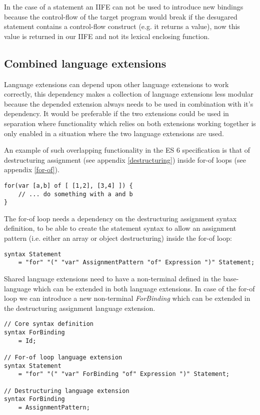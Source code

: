 In the case of a statement an IIFE can not be used to introduce new bindings because the control-flow of the target program would break if the desugared statement contains a control-flow construct (e.g. it returns a value), now this value is returned in our IIFE and not its lexical enclosing function.

\subsection{Combined language extensions} \label{par:combined-extensions}
Language extensions can depend upon other language extensions to work correctly, this dependency makes a collection of language extensions less modular because the depended extension always needs to be used in combination with it's dependency. It would be preferable if the two extensions could be used in separation where functionality which relies on both extensions working together is only enabled in a situation where the two language extensions are used.

An example of such overlapping functionality in the ES 6 specification is that of destructuring assignment (see appendix \ref{destructuring}) inside for-of loops (see appendix \ref{for-of}).

\begin{lstlisting}
for(var [a,b] of [ [1,2], [3,4] ]) {
	// ... do something with a and b
}
\end{lstlisting}

The for-of loop needs a dependency on the destructuring assignment syntax definition, to be able to create the statement syntax to allow an assignment pattern (i.e. either an array or object destructuring) inside the for-of loop:

\begin{lstlisting}[language=rascal]
syntax Statement
	= "for" "(" "var" AssignmentPattern "of" Expression ")" Statement;
\end{lstlisting}

Shared language extensions need to have a non-terminal defined in the base-language which can be extended in both language extensions. In case of the for-of loop we can introduce a new non-terminal \textit{ForBinding} which can be extended in the destructuring assignment language extension.

\begin{lstlisting}[language=rascal]
// Core syntax definition
syntax ForBinding
	= Id;

// For-of loop language extension
syntax Statement
	= "for" "(" "var" ForBinding "of" Expression ")" Statement;

// Destructuring language extension
syntax ForBinding
	= AssignmentPattern;
\end{lstlisting}

